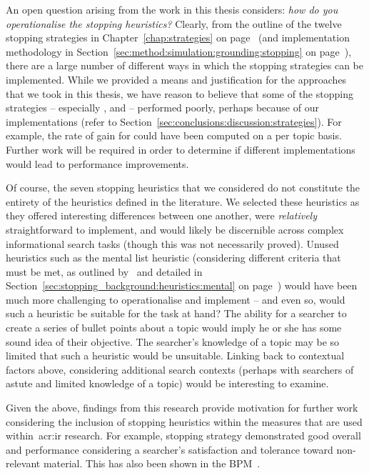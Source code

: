 An open question arising from the work in this thesis considers: \emph{how do you operationalise the stopping heuristics?} Clearly, from the outline of the twelve stopping strategies in Chapter~\ref{chap:strategies} on page~\pageref{chap:strategies} (and implementation methodology in Section~\ref{sec:method:simulation:grounding:stopping} on page~\pageref{sec:method:simulation:grounding:stopping}), there are a large number of different ways in which the stopping strategies can be implemented. While we provided a means and justification for the approaches that we took in this thesis, we have reason to believe that some of the stopping strategies -- especially ,  and  -- performed poorly, perhaps because of our implementations (refer to Section~\ref{sec:conclusions:discussion:strategies}). For example, the rate of gain for  could have been computed on a per topic basis. Further work will be required in order to determine if different implementations would lead to performance improvements.

Of course, the seven stopping heuristics that we considered do not constitute the entirety of the heuristics defined in the literature. We selected these heuristics as they offered interesting differences between one another, were \emph{relatively} straightforward to implement, and would likely be discernible across complex informational search tasks (though this was not necessarily proved). Unused heuristics such as the mental list heuristic (considering different criteria that must be met, as outlined by~\cite{nickles1995judgment} and detailed in Section~\ref{sec:stopping_background:heuristics:mental} on page~\pageref{sec:stopping_background:heuristics:mental}) would have been much more challenging to operationalise and implement -- and even so, would such a heuristic be suitable for the task at hand? The ability for a searcher to create a series of bullet points about a topic would imply he or she has some sound idea of their objective. The searcher's knowledge of a topic may be so limited that such a heuristic would be unsuitable. Linking back to contextual factors above, considering additional search contexts (perhaps with searchers of astute and limited knowledge of a topic) would be interesting to examine.

Given the above, findings from this research provide motivation for further work considering the inclusion of stopping heuristics within the measures that are used within~\gls{acr:ir} research. For example, stopping strategy  demonstrated good overall and performance considering a searcher's satisfaction and tolerance toward non-relevant material. This has also been shown in the BPM~\citep{zhang2017bejewled}.

